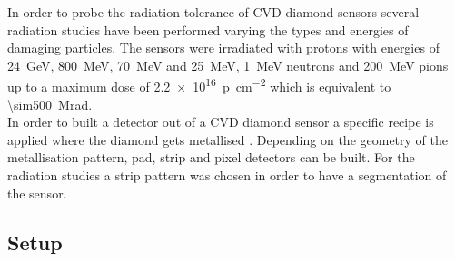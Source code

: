 In order to probe the radiation tolerance of \ac{CVD} diamond sensors several radiation studies have been performed varying the types and energies of damaging particles. The sensors were irradiated with protons with energies of \SI{24}{\giga\electronvolt}, \SI{800}{\mega\electronvolt}, \SI{70}{\mega\electronvolt} and \SI{25}{\mega\electronvolt}, \SI{1}{\mega\electronvolt} neutrons and \SI{200}{\mega\electronvolt} pions up to a maximum dose of \SI{2.2e16}{p\per\centi\meter^2} which is equivalent to \SI{\sim500}{\mega rad}.\\
In order to built a detector out of a \ac{CVD} diamond sensor a specific recipe is applied where the diamond gets metallised \cite{sussmann}. Depending on the geometry of the metallisation pattern, pad, strip and pixel detectors can be built. For the radiation studies a strip pattern was chosen in order to have a segmentation of the sensor. 

% 
% 

\subsection{Setup}

